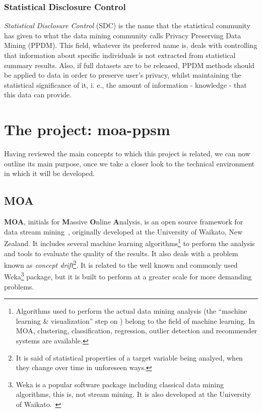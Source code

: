 \subsubsection{Statistical Disclosure Control}

\textit{Statistical Disclosure Control} (SDC) is the name that the statistical community
has given to what the data mining community calls Privacy Preserving Data Mining (PPDM).
This field, whatever its preferred name is, deals with controlling that information about
specific individuals is not extracted from statistical summary results. Also, if full
datasets are to be released, PPDM methods should be applied to data in order to preserve
user's privacy, whilst maintaining the statistical significance of it, i. e., the amount
of information - knowledge - that this data can provide.

\section{The project: moa-ppsm}
\label{Introduction::moa-ppsm}

Having reviewed the main concepts to which this project is related, we can now outline
its main purpose, once we take a closer look to the technical environment in which it
will be developed.

\subsection{MOA}
\label{Introduction::moa-ppsm::MOA}


\textbf{MOA}, initials for \textbf{M}assive \textbf{O}nline \textbf{A}nalysis, is an
open source framework for data stream mining~\citep{web:MOA}, originally
developed at the University of Waikato, New Zealand. It includes several machine learning
algorithms\footnote{Algorithms used to perform the actual data mining analysis (the
“machine learning \& visualization” step on ) belong to the
field of machine learning. In MOA, clustering, classification, regression, outlier
detection and recommender systems are available.} to perform the analysis and tools
to evaluate the quality of the results. It also deals with a problem known as
\textit{concept drift}\footnote{It is said of statistical properties of a target variable
being analyed, when they change over time in unforeseen ways.}. It is related to the well
known and commonly used Weka\footnote{Weka is a popular software package including
classical data mining algorithms, this is, not stream mining. It is also developed at
the University of Waikato.~\citep{web:Weka}} package, but it is built to perform at
a greater scale for more demanding problems.

